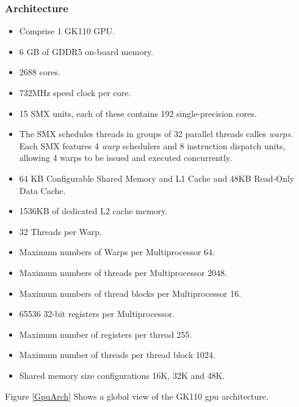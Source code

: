 \subsubsection{Architecture}
\begin{itemize}
    \item Comprise 1 GK110 GPU\cite{gpu_specs}.
    \item 6 GB of GDDR5 on-board memory\cite{gpu_specs}.
    \item 2688 cores\cite{gpu_specs}.
    \item 732MHz speed clock per core\cite{gpu_specs}.
    \item 15 SMX units, each of these contains 192 single-precision cores\cite{gpu_specs1}.
    \item The SMX schedules threads in groups of 32 parallel threads calles \emph{warps}. Each SMX features 4 \emph{warp}
        schedulers and 8 instruction dispatch units, allowing 4 warps to be issued and executed concurrently\cite{gpu_specs1}.
    \item 64 KB Configurable Shared Memory and L1 Cache and 48KB Read‐Only Data Cache\cite{gpu_specs1}.
    \item 1536KB of dedicated L2 cache memory\cite{gpu_specs1}.
    \item 32 Threads per Warp\cite{gpu_specs1}.
    \item Maximum numbers of Warps per Multiprocessor 64\cite{gpu_specs1}.
    \item Maximum numbers of threads per Multiprocessor 2048\cite{gpu_specs1}.
    \item Maximum numbers of thread blocks per Multiprocessor 16\cite{gpu_specs1}.
    \item 65536 32-bit registers per Multiprocessor\cite{gpu_specs1}.
    \item Maximum number of registers per thread 255\cite{gpu_specs1}.
    \item Maximum number of threads per thread block 1024\cite{gpu_specs1}.
    \item Shared memory size configurations 16K, 32K and 48K\cite{gpu_specs1}.
\end{itemize}

\par{Figure \ref{GpuArch} Shows a global view of the GK110 gpu architecture.}

